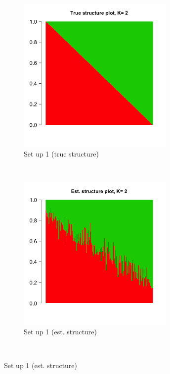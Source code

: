     

\begin{figure}[ht]
    \centering
    \begin{subfigure}[t]{0.5\textwidth}
        \centering
        \includegraphics[height=3in]{../plots/true_structure_setup_1.png}
        \caption{Set up 1 (true structure)}
    \end{subfigure}%
    ~ 
    \begin{subfigure}[t]{0.5\textwidth}
        \centering
        \includegraphics[height=3in]{../plots/est_structure_setup_1.png}
        \caption{Set up 1 (est. structure)}
    \end{subfigure}   \\
    

\end{figure}
